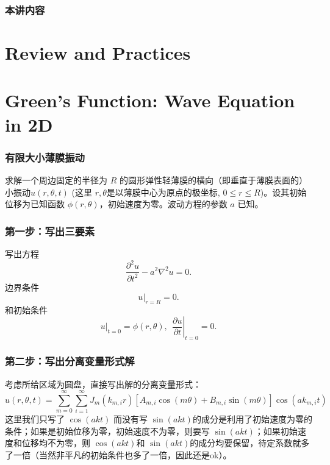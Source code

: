 \documentclass[CJK]{beamer}
\date{}
\begin{document}
  \bch



\begin{frame}
  \frametitle{本讲内容}
  
\tableofcontents

\end{frame}

\section{Review and Practices}




\section{Green's Function: Wave Equation in 2D}

\begin{frame}
  \frametitle{有限大小薄膜振动}
求解一个周边固定的半径为 $R$ 的圆形弹性轻薄膜的横向（即垂直于薄膜表面的）小振动$u(r,\theta, t)$ (这里 $r,\theta$是以薄膜中心为原点的极坐标, $0\le r\le R$)。设其初始位移为已知函数 $\phi(r,\theta)$，初始速度为零。波动方程的参数 $a$ 已知。
\end{frame}


\begin{frame}
  \frametitle{第一步：写出三要素}
  写出方程
  $$\frac{\partial^2u}{\partial t^2}-a^2\nabla^2u = 0.$$
  边界条件
  $$ \left.u\right\vert_{r=R} = 0.$$
  和初始条件
  $$ \left.u\right\vert_{t=0} = \phi(r,\theta),\ \ \left.\frac{\partial u}{\partial t}\right\vert_{t=0} = 0.$$  
\end{frame}


\begin{frame}
  \frametitle{第二步：写出分离变量形式解}
  考虑所给区域为圆盘，直接写出解的分离变量形式：
  $$u(r,\theta, t)= \sum_{m=0}^\infty \sum_{i=1}^\infty J_m(k_{m,i}r)\left[A_{m,i}\cos(m\theta)+B_{m,i}\sin(m\theta)\right]\cos(ak_{m,i}t)$$
  {\scriptsize 这里我们只写了 $\cos(akt)$ 而没有写 $\sin(akt)$的成分是利用了初始速度为零的条件；如果是初始位移为零，初始速度不为零，则要写 $\sin(akt)$；如果初始速度和位移均不为零，则 $\cos(akt)$和 $\sin(akt)$的成分均要保留，待定系数就多了一倍（当然非平凡的初始条件也多了一倍，因此还是ok）。  }

\end{frame}
\end{document}
